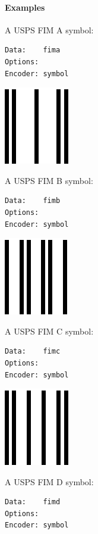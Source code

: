 \hypertarget{examples-35}{%
\paragraph{Examples}\label{examples-35}}

A USPS FIM A symbol:

\begin{verbatim}
Data:    fima
Options: 
Encoder: symbol
\end{verbatim}

\includegraphics{images/fima-1.eps}

A USPS FIM B symbol:

\begin{verbatim}
Data:    fimb
Options: 
Encoder: symbol
\end{verbatim}

\includegraphics{images/fimb-1.eps}

A USPS FIM C symbol:

\begin{verbatim}
Data:    fimc
Options: 
Encoder: symbol
\end{verbatim}

\includegraphics{images/fimc-1.eps}

A USPS FIM D symbol:

\begin{verbatim}
Data:    fimd
Options: 
Encoder: symbol
\end{verbatim}

